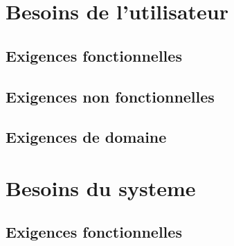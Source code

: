 \documentclass[11pt,a4paper]{article}
\begin{document}
\section{Besoins de l'utilisateur}
\label{sec:besoins}


\subsection{Exigences fonctionnelles}
\label{sec:exi-fonc}


\subsection{Exigences non fonctionnelles}
\label{sec:exi-nonfonc}



\subsection{Exigences de domaine}
\label{sec:exi-dom}

\section{Besoins du systeme}
\label{sec:besoins-sys}


\subsection{Exigences fonctionnelles}
\label{sec:exi-fonc-sys}

\end{document}
